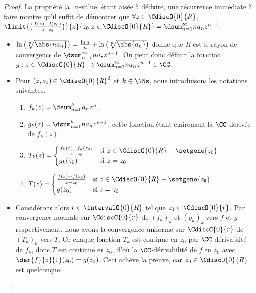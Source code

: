 \begin{proof}
	La propriété \ref{a_n-value} étant aisée à déduire, une récurrence immédiate à faire montre qu'il suffit de démontrer que
	$\forall z \in \CdiscO{0}{R}$,
	$ \limit{\big( \frac{f(z) - f(z_0)}{z - z_0} \big)}%
	        {z}{z_0 | z \in \CdiscO{0}{R}}
	= \dsum_{n = 1}^{\infty} n a_n z^{n - 1}$.
	\begin{itemize}
		\item
		$ \ln \big( \sqrt[n]{\abs{n a_n}} \big)
		= \frac{\ln n}{n} + \ln \big( \sqrt[n]{\abs{a_n}} \big)$
		donne que
		$R$ est le rayon de convergence de
		$\dsum_{n = 1}^{\infty} n a_n z^{n - 1}$.
		On peut donc définir la fonction $g: z \in \CdiscO{0}{R} \mapsto \dsum_{n = 1}^{\infty} n a_n z^{n - 1} \in \CC$.


		\item Pour $(z , z_0) \in \CdiscO{0}{R}^2$ et $k \in \NNs$, nous introduisons les notations suivantes.
        \begin{enumerate}[label=(\alph*)]
	        \item $f_k(z) = \dsum_{n = 0}^{k} a_n z^n$.

	        \item $g_k(z) = \dsum_{n = 1}^{k} n a_n z^{n-1}$,
	        cette fonction étant clairement la $\CC$-dérivée de $f_k(z)$.

	        \item $T_k(z) =
			\begin{cases}
	    		  \frac{f_k(z) - f_k(z_0)}{z - z_0}
				& \text{si $z \in \CdiscO{0}{R} - \setgene{z_0}$}
				\\
	   			  g_k(z_0) 
				& \text{si $z = z_0$}
	 		\end{cases}$

	        \item $T(z) =
			\begin{cases}
	    		  \frac{f(z) - f(z_0)}{z - z_0} 
				& \text{si $z \in \CdiscO{0}{R} - \setgene{z_0}$}
				\\
	   			  g(z_0)
				& \text{si $z = z_0$}
	 		\end{cases}$
	    \end{enumerate}


		\item Considérons alors $r \in \intervalO{0}{R}$ tel que $z_0 \in \CdiscO{0}{r}$.
		Par convergence normale sur $\CdiscC{0}{r}$ de $(f_k)_k$ et $(g_k)_k$ vers $f$ et $g$ respectivement,
		nous avons la convergence uniforme sur $\CdiscC{0}{r}$ de $(T_k)_k$ vers $T$. 
		Or chaque fonction $T_k$ est continue en $z_0$ par $\CC$-dérivablité de $f_k$, donc $T$ est continue en $z_0$,
		d'où
		la $\CC$-dérivabilité de  $f$ en $z_0$ avec $\der{f}{z}{1}(z_0) = g(z_0)$.
		Ceci achève la preuve, car $z_0 \in \CdiscO{0}{R}$ est quelconque.
	\end{itemize}

	\null\vspace{-6ex}
\end{proof}


